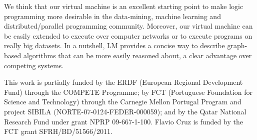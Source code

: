 \documentclass{sigplanconf}
\begin{document}
We think that our virtual machine is an excellent starting point to make
logic programming more desirable in the data-mining, machine learning and
distributed/parallel programming community. Moreover, our virtual machine can
be easily extended to execute over computer networks or to execute programs on really big datasets.
In a nutshell, LM provides a concise way to describe
graph-based algorithms that can be more easily reasoned about, a clear advantage over
competing systems.
 
\makeatletter{}\acks

This work is partially funded by the ERDF (European Regional
Development Fund) through the COMPETE Programme; by FCT (Portuguese
Foundation for Science and Technology) through the Carnegie Mellon
Portugal Program and project SIBILA (NORTE-07-0124-FEDER-000059); and
by the Qatar National Research Fund under grant NPRP
09-667-1-100. Flavio Cruz is funded by the FCT grant
SFRH/BD/51566/2011.
 

\balance



\end{document}
